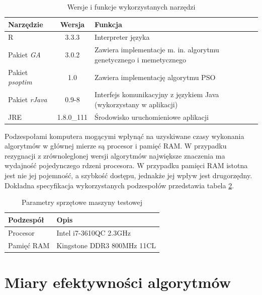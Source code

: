 \begin{table}[hb]
\label{table:wykorzystane_narzedzia}
\caption{Wersje i funkcje wykorzystanych narzędzi}
\begin{tabularx}{\textwidth}{|l|c|X|}
	\hline
	Narzędzie & Wersja & Funkcja \\
	\hline
	R & 3.3.3 & Interpreter języka \\
	Pakiet \emph{GA} & 3.0.2 & Zawiera implementacje m. in. algorytmu genetycznego i memetycznego \\
	Pakiet \emph{psoptim} & 1.0 & Zawiera implementację algorytmu PSO \\
	Pakiet \emph{rJava} & 0.9-8 & Interfejs komunikacyjny z językiem Java (wykorzystany w aplikacji) \\
	JRE & 1.8.0\_111 & Środowisko uruchomieniowe aplikacji \\
	\hline
	\end{tabularx}
\end{table}
\par
Podzespołami komputera mogącymi wpłynąć na uzyskiwane czasy wykonania algorytmów w głównej mierze są procesor i pamięć RAM. W przypadku rezygnacji z zrównoleglonej wersji algorytmów największe znaczenia ma wydajność pojedynczego rdzeni procesora. W przypadku pamięci RAM istotna jest nie jej pojemność, a szybkość dostępu, jednakże jej wpływ jest drugorzędny. Dokładna specyfikacja wykorzystanych podzespołów przedstawia tabela \ref{table:parametry_komputera}.
\begin{table}[hb]
\caption{Parametry sprzętowe maszyny testowej}
\label{table:parametry_komputera}
\begin{center}
\begin{tabular}{|l|l|}
	\hline
	Podzespół & Opis \\
	\hline
	Procesor & Intel i7-3610QC 2.3GHz \\
	Pamięć RAM & Kingstone DDR3 800MHz 11CL \\
	\hline
	\end{tabular}
\end{center}
\end{table}



\section{Miary efektywności algorytmów}
\label{sec:przyjete_miary_efektywnosci_algorytmow}

